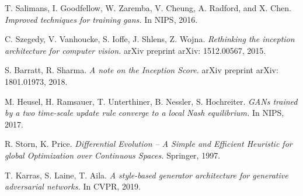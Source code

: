\documentclass[12pt,a4paper,openany]{book}
\begin{document}
\begin{thebibliography}{a,b,c}
 T. Salimans, I. Goodfellow, W. Zaremba, V. Cheung, A. Radford, and X. Chen. {\it Improved techniques for training gans.} In NIPS, 2016.

 C. Szegedy, V. Vanhoucke, S. Ioffe, J. Shlens, Z. Wojna. {\it Rethinking the inception architecture for computer vision.} arXiv preprint arXiv: 1512.00567, 2015.

 S. Barratt, R. Sharma. {\it A note on the Inception Score.} arXiv preprint arXiv: 1801.01973, 2018.

 M. Heusel, H. Ramsauer, T. Unterthiner, B. Nessler, S. Hochreiter. {\it GANs trained by a two time-scale update rule converge to a local Nash equilibrium.} In NIPS, 2017.

 R. Storn, K. Price. {\it Differential Evolution – A Simple and Efficient Heuristic for global Optimization over Continuous Spaces.} Springer, 1997.

 T. Karras, S. Laine, T. Aila. {\it A style-based generator architecture for generative adversarial networks.} In CVPR, 2019.
\end{thebibliography}
\end{document}
